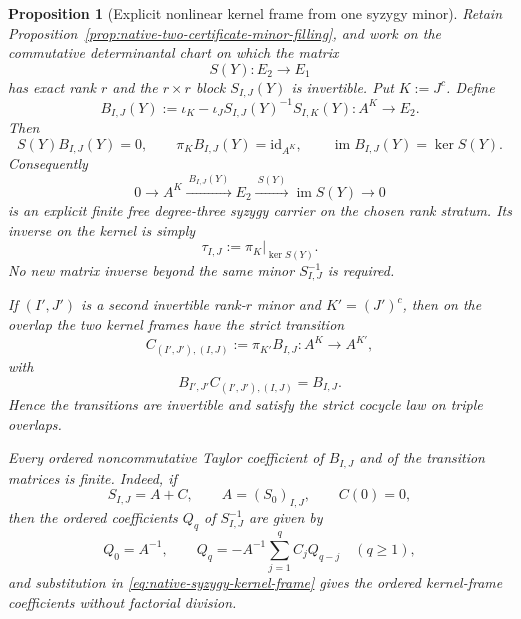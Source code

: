\documentclass[11pt]{article}
\newtheorem{proposition}[theorem]{Proposition}
\theoremstyle{definition}
\begin{document}
\begin{proposition}[Explicit nonlinear kernel frame from one syzygy minor]\label{prop:native-syzygy-kernel-frame}
Retain Proposition~\ref{prop:native-two-certificate-minor-filling}, and work on
the commutative determinantal chart on which the matrix
\[
 S(Y):E_2\longrightarrow E_1
\]
has exact rank $r$ and the $r\times r$ block $S_{I,J}(Y)$ is invertible.  Put
$K:=J^c$.  Define
\begin{equation}\label{eq:native-syzygy-kernel-frame}
 \boxed{
 B_{I,J}(Y)
 :=\iota_K
   -\iota_J S_{I,J}(Y)^{-1}S_{I,K}(Y)
 :A^{K}\longrightarrow E_2.
 }
\end{equation}
Then
\begin{equation}\label{eq:native-syzygy-kernel-exact}
 S(Y)B_{I,J}(Y)=0,
 \qquad
 \pi_KB_{I,J}(Y)=\mathrm{id}_{A^K},
 \qquad
 \operatorname{im}B_{I,J}(Y)=\ker S(Y).
\end{equation}
Consequently
\begin{equation}\label{eq:native-degree-three-carrier}
 0\longrightarrow A^K
 \xrightarrow{\ B_{I,J}(Y)\ }
 E_2\xrightarrow{\ S(Y)\ }\operatorname{im}S(Y)
 \longrightarrow0
\end{equation}
is an explicit finite free degree-three syzygy carrier on the chosen
rank stratum.  Its inverse on the kernel is simply
\begin{equation}\label{eq:native-kernel-coordinate-section}
 \tau_{I,J}:=\pi_K\big|_{\ker S(Y)}.
\end{equation}
No new matrix inverse beyond the same minor $S_{I,J}^{-1}$ is required.

If $(I',J')$ is a second invertible rank-$r$ minor and $K'=(J')^c$, then on
the overlap the two kernel frames have the strict transition
\begin{equation}\label{eq:native-syzygy-frame-transition}
 C_{(I',J'),(I,J)}
 :=\pi_{K'}B_{I,J}:A^K\longrightarrow A^{K'},
\end{equation}
with
\begin{equation}\label{eq:native-syzygy-frame-transition-identity}
 B_{I',J'}C_{(I',J'),(I,J)}=B_{I,J}.
\end{equation}
Hence the transitions are invertible and satisfy the strict cocycle law on
triple overlaps.

Every ordered noncommutative Taylor coefficient of $B_{I,J}$ and of the
transition matrices is finite.  Indeed, if
\[
 S_{I,J}=A+C,
 \qquad A=(S_0)_{I,J},
 \qquad C(0)=0,
\]
then the ordered coefficients $Q_q$ of $S_{I,J}^{-1}$ are given by
\begin{equation}\label{eq:native-syzygy-inverse-ordered-recursion}
 Q_0=A^{-1},
 \qquad
 Q_q=-A^{-1}\sum_{j=1}^{q}C_jQ_{q-j}
 \quad(q\ge1),
\end{equation}
and substitution in \eqref{eq:native-syzygy-kernel-frame} gives the ordered
kernel-frame coefficients without factorial division.
\end{proposition}
\end{document}
